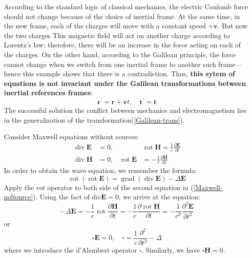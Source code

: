 According to the standard logic of classical mechanics, the electric Coulomb force should not change because of the choice of inertial frame. At the same time, in the new frame, each of the charges will move with a constant speed $+\mathbf{v}$. But now the two charges  This magnetic field will act on another charge according to Lorentz's law; therefore, there will be an increase in the force acting on each of the charges. On the other hand, according to the Galilean principle, the force cannot change when we switch from one inertial frame to another such frame—hence
this example shows that there is a contradiction. Thus, \textbf{this sytem of equations is not invariant under the Galilean transformations between inertial references frames}:
\begin{equation}
\mathbf{r}^{\prime}=\mathbf{r}+\mathbf{v} t, \quad \mathbf{t}^{\prime}=\mathbf{t}
\label{Galilean-trans}
\end{equation}
The successful solution the conflict between mechanics and electromagnetism lies in the generalization of the transformation(\ref{Galilean-trans}).  \textbf{}

Consider Maxwell equations without sources:
\begin{equation}
\begin{aligned}
\operatorname{div} \mathbf{E} &=0, & & \operatorname{rot} \mathbf{H}=\frac{1}{c} \frac{\partial \mathbf{E}}{\partial t} \\
\operatorname{div} \mathbf{H} &=0, & \operatorname{rot} \mathbf{E} &=-\frac{1}{c} \frac{\partial \mathbf{H}}{\partial t}
\end{aligned}
\label{Maxwell-noSource}
\end{equation}
In order to obtain the wave equation, we remember the formula:
$$
\operatorname{rot}(\operatorname{rot} \mathbf{E})=\operatorname{grad}(\operatorname{div} \mathbf{E})-\Delta \mathbf{E}
$$
Apply the $rot$ operator to both side of the second equation in (\ref{Maxwell-noSource}). Using the fact of $div\mathbf{E}=0$, we arrive at the equation:
\begin{equation}
-\Delta \mathbf{E}=-\frac{1}{c} \operatorname{rot} \frac{\partial \mathbf{H}}{\partial t}=-\frac{1}{c} \frac{\partial \operatorname{rot} \mathbf{H}}{\partial t}=-\frac{1}{c^{2}} \frac{\partial^{2} \mathbf{E}}{\partial t^{2}}
\end{equation}
or
\begin{equation}
\square \mathbf{E}=0, \quad \square=\frac{1}{c} \frac{\partial^{2}}{\partial t^{2}}-\Delta
\end{equation}
where we introduce the d'Alembert operator $\square$. Similarly, we have $\square \mathbf{H}=0$.

